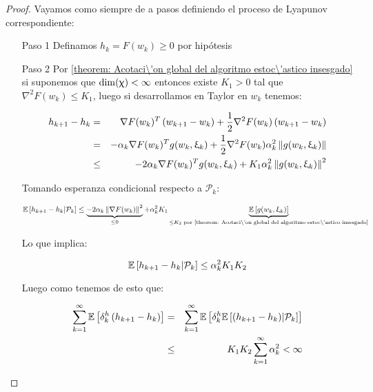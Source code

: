 \begin{proof}
	Vayamos como siempre de a pasos definiendo el proceso de Lyapunov correspondiente:
	
	\begin{enumerate}
		\item [Paso 1] Definamos $h_k = F(w_k) \geq 0$ por hip\'otesis
		\item[Paso 2] Por \ref{theorem: Acotaci\'on global del algoritmo estoc\'astico insesgado} si suponemos que $\dim(\upchi) < \infty$ entonces existe $K_1 > 0$ tal que $\nabla^2 F(w_k) \leq K_1$, luego si desarrollamos en Taylor en $w_k$ tenemos:
		
		\begin{equation*}
			\begin{aligned}
				h_{k+1} - h_k & = & \nabla F(w_k)^T\left(w_{k+1} - w_k\right) + \frac{1}{2} \nabla^2 F(w_k) \left(w_{k+1} - w_k\right) \\
				& = & - \alpha_k \nabla F(w_k)^T g(w_k, \upxi_{k}) + \frac{1}{2} \nabla^2 F(w_k)  \alpha_k^2 \left\lVert g(w_k, \upxi_{k})\right\rVert \\
				& \leq & -2 \alpha_k \nabla F(w_k)^Tg(w_k, \upxi_{k}) + K_1 \alpha_k^2 \left\lVert g(w_k, \upxi_{k})\right\rVert^2
			\end{aligned}
		\end{equation*}
		 
		Tomando esperanza condicional respecto a $\mathcal{P}_k$:
		
		\begin{equation}
			\label{eq: Acotacion de la sucesin en la iteracion}
			\mathbb{E} \left[{h_{k+1} - h_k} \vert \mathcal{P}_{k}\right] \leq \underbrace{-2 \alpha_k \left\lVert\nabla F(w_k)\right\rVert^2}_{\leq 0}  + \alpha_k^2 K_1 \underbrace{\mathbb{E} \left[g(w_k, \upxi_{k})\right]}_{\leq K_2 \text{ por  \ref{theorem: Acotaci\'on global del algoritmo estoc\'astico insesgado}}}
		\end{equation}
		
		Lo que implica:
		
		\begin{equation}
			\mathbb{E} \left[{h_{k+1} - h_k} \vert \mathcal{P}_{k}\right] \leq \alpha_k^2 K_1K_2
		\end{equation}
		 
		 Luego como tenemos de esto que:
		 
		 \begin{equation*}
		 \begin{aligned}
		 \sum\limits_{k=1}^{\infty} {\mathbb{E} \left[\delta_k^{h} \left(h_{k+1} - h_k\right)\right]} & = & \sum\limits_{k=1}^{\infty} {\mathbb{E} \left[\delta_k^{h} \mathbb{E} \left[{\left(h_{k+1} - h_k\right)} \vert \mathcal{P}_{k}\right]\right]} \\
		 & \leq & K_1K_2\sum\limits_{k=1}^{\infty} {\alpha_k^2} < \infty
		 \end{aligned}
		 \end{equation*}
		 

\end{enumerate}
\end{proof}
